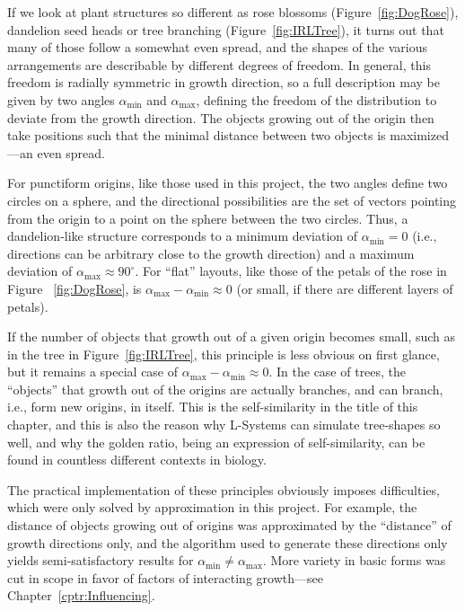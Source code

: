 \documentclass[11pt, abstract=on]{scrartcl}
\begin{document}
If we look at plant structures so different as rose blossoms (Figure~\ref{fig:DogRose}), dandelion seed heads or tree branching (Figure~\ref{fig:IRLTree}), it turns out that many of those follow a somewhat even spread, and the shapes of the various arrangements are describable by different degrees of freedom. In general, this freedom is radially symmetric in growth direction, so a full description may be given by two angles $\alpha_\text{min}$ and $\alpha_\text{max}$, defining the freedom of the distribution to deviate from the growth direction. The objects growing out of the origin then take positions such that the minimal distance between two objects is maximized---an even spread.

For punctiform origins, like those used in this project, the two angles define two circles on a sphere, and the directional possibilities are the set of vectors pointing from the origin to a point on the sphere between the two circles. Thus, a dandelion-like structure corresponds to a minimum deviation of $\alpha_\text{min} = 0$ (i.e., directions can be arbitrary close to the growth direction) and a maximum deviation of 
$\alpha_\text{max} \approx 90^\circ$. For ``flat'' layouts, like those of the petals of the rose in Figure~ \ref{fig:DogRose}, is $\alpha_\text{max} - \alpha_\text{min} \approx 0$ (or small, if there are different layers of petals).

If the number of objects that growth out of a given origin becomes small, such as in the tree in Figure~\ref{fig:IRLTree}, this principle is less obvious on first glance, but it remains a special case of $\alpha_\text{max} - \alpha_\text{min} \approx 0$. In the case of trees, the ``objects'' that growth out of the origins are actually branches, and can branch, i.e., form new origins, in itself. This is the self-similarity in the title of this chapter, and this is also the reason why L-Systems can simulate tree-shapes so well, and why the golden ratio, being an expression of self-similarity, can be found in countless different contexts in biology.

The practical implementation of these principles obviously imposes difficulties, which were only solved by approximation in this project. For example, the distance of objects growing out of origins was approximated by the ``distance'' of growth directions only, and the algorithm used to generate these directions only yields semi-satisfactory results for $\alpha_\text{min} \neq \alpha_\text{max}$. More variety in basic forms was cut in scope in favor of factors of interacting growth---see Chapter~\ref{cptr:Influencing}.
\end{document}
